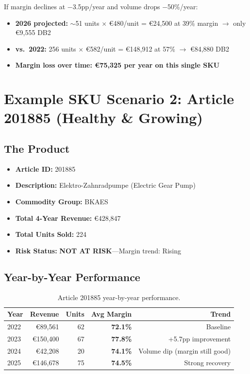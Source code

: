 \documentclass[11pt,a4paper]{article}
\newcommand{\EUR}{\euro{}}
\newcommand{\pp}{pp}
\begin{document}
If margin declines at $-$3.5\pp{}/year and volume drops $-$50\%/year:
\begin{itemize}[nosep]
  \item \textbf{2026 projected:} $\sim$51 units $\times$ \EUR480/unit = \EUR24{,}500 at 39\% margin $\to$ only \EUR9{,}555 DB2
  \item \textbf{vs.\ 2022:} 256 units $\times$ \EUR582/unit = \EUR148{,}912 at 57\% $\to$ \EUR84{,}880 DB2
  \item \textbf{Margin loss over time: \EUR75{,}325 per year on this single SKU}
\end{itemize}

\section{Example SKU Scenario 2: Article 201885 (Healthy \& Growing)}

\subsection{The Product}

\begin{itemize}[nosep]
  \item \textbf{Article ID:} 201885
  \item \textbf{Description:} Elektro-Zahnradpumpe (Electric Gear Pump)
  \item \textbf{Commodity Group:} BKAES
  \item \textbf{Total 4-Year Revenue:} \EUR428{,}847
  \item \textbf{Total Units Sold:} 224
  \item \textbf{Risk Status:} \textbf{NOT AT RISK}---Margin trend: Rising
\end{itemize}

\subsection{Year-by-Year Performance}

\begin{table}[H]
\centering
\begin{tabular}{lrrrr}
\toprule
\textbf{Year} & \textbf{Revenue} & \textbf{Units} & \textbf{Avg Margin} & \textbf{Trend} \\
\midrule
2022 & \EUR89{,}561  & 62 & \textbf{72.1\%} & Baseline \\
2023 & \EUR150{,}400 & 67 & \textbf{77.8\%} & +5.7\pp{} improvement \\
2024 & \EUR42{,}208  & 20 & \textbf{74.1\%} & Volume dip (margin still good) \\
2025 & \EUR146{,}678 & 75 & \textbf{74.5\%} & Strong recovery \\
\bottomrule
\end{tabular}
\caption{Article 201885 year-by-year performance.}
\end{table}
\end{document}
